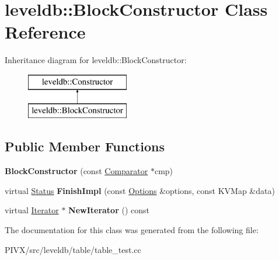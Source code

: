 \hypertarget{classleveldb_1_1_block_constructor}{}\section{leveldb\+:\+:Block\+Constructor Class Reference}
\label{classleveldb_1_1_block_constructor}
Inheritance diagram for leveldb\+:\+:Block\+Constructor\+:\begin{figure}[H]
\begin{center}
\leavevmode
\includegraphics[height=2.000000cm]{classleveldb_1_1_block_constructor}
\end{center}
\end{figure}
\subsection*{Public Member Functions}
\begin{DoxyCompactItemize}
\item 
\mbox{\label{classleveldb_1_1_block_constructor_a1f89523b9e688d6525da80d5595bee4c}} 
{\bfseries Block\+Constructor} (const \mbox{\hyperlink{structleveldb_1_1_comparator}{Comparator}} $\ast$cmp)
\item 
\mbox{\label{classleveldb_1_1_block_constructor_ae3f38f0769d34cb7d80776b8249f48ae}} 
virtual \mbox{\hyperlink{classleveldb_1_1_status}{Status}} {\bfseries Finish\+Impl} (const \mbox{\hyperlink{structleveldb_1_1_options}{Options}} \&options, const K\+V\+Map \&data)
\item 
\mbox{\label{classleveldb_1_1_block_constructor_ae1eda84c2235ed692050910218aa9e3e}} 
virtual \mbox{\hyperlink{classleveldb_1_1_iterator}{Iterator}} $\ast$ {\bfseries New\+Iterator} () const
\end{DoxyCompactItemize}


The documentation for this class was generated from the following file\+:\begin{DoxyCompactItemize}
\item 
P\+I\+V\+X/src/leveldb/table/table\+\_\+test.\+cc\end{DoxyCompactItemize}
